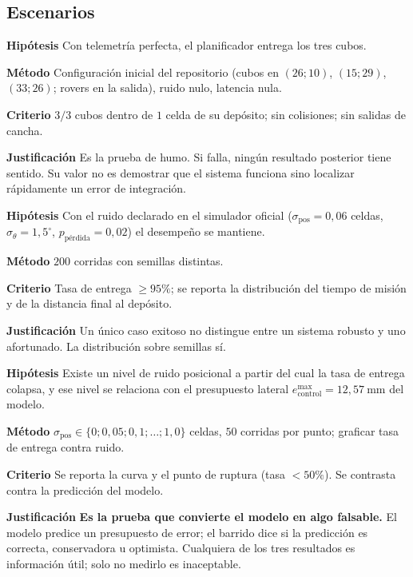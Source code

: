\documentclass[11pt,a4paper]{article}
\newcommand{\grados}{^{\circ}}
\newenvironment{prueba}[2]{%
  \par\medskip\noindent
  \begin{tcolorbox}[enhanced,breakable,colback=white,colframe=black!45,
    boxrule=0.5pt,arc=1pt,left=6pt,right=6pt,top=4pt,bottom=4pt,
    title={\bfseries #1\quad\normalfont #2},
    colbacktitle=black!8,coltitle=black,fonttitle=\bfseries\small]
  \small
}{\end{tcolorbox}\par\medskip}
\newcommand{\campo}[1]{\par\smallskip\noindent\textbf{#1}\quad\ignorespaces}
\begin{document}
\subsection{Escenarios}

\begin{prueba}{N4.1}{Misión nominal sin perturbación}
\campo{Hipótesis} Con telemetría perfecta, el planificador entrega los tres cubos.
\campo{Método} Configuración inicial del repositorio (cubos en $(26;10)$, $(15;29)$,
$(33;26)$; rovers en la salida), ruido nulo, latencia nula.
\campo{Criterio} $3/3$ cubos dentro de $1$ celda de su depósito; sin colisiones; sin
salidas de cancha.
\campo{Justificación} Es la prueba de humo. Si falla, ningún resultado posterior tiene
sentido. Su valor no es demostrar que el sistema funciona sino localizar rápidamente
un error de integración.
\end{prueba}

\begin{prueba}{N4.2}{Misión con perturbación nominal}
\campo{Hipótesis} Con el ruido declarado en el simulador oficial
($\sigma_{\mathrm{pos}} = 0{,}06$ celdas, $\sigma_\theta = 1{,}5\grados$,
$p_{\mathrm{pérdida}} = 0{,}02$) el desempeño se mantiene.
\campo{Método} $200$ corridas con semillas distintas.
\campo{Criterio} Tasa de entrega $\ge 95\%$; se reporta la distribución del tiempo de
misión y de la distancia final al depósito.
\campo{Justificación} Un único caso exitoso no distingue entre un sistema robusto y uno
afortunado. La distribución sobre semillas sí.
\end{prueba}

\begin{prueba}{N4.3}{Barrido de ruido hasta el punto de ruptura}
\campo{Hipótesis} Existe un nivel de ruido posicional a partir del cual la tasa de
entrega colapsa, y ese nivel se relaciona con el presupuesto lateral
$e_{\mathrm{control}}^{\max} = 12{,}57\ \mathrm{mm}$ del modelo.
\campo{Método} $\sigma_{\mathrm{pos}} \in \{0; 0{,}05; 0{,}1; \dots; 1{,}0\}$ celdas,
$50$ corridas por punto; graficar tasa de entrega contra ruido.
\campo{Criterio} Se reporta la curva y el punto de ruptura (tasa $<50\%$). Se contrasta
contra la predicción del modelo.
\campo{Justificación} \textbf{Es la prueba que convierte el modelo en algo falsable.}
El modelo predice un presupuesto de error; el barrido dice si la predicción es correcta,
conservadora u optimista. Cualquiera de los tres resultados es información útil; solo
no medirlo es inaceptable.
\end{prueba}
\end{document}
